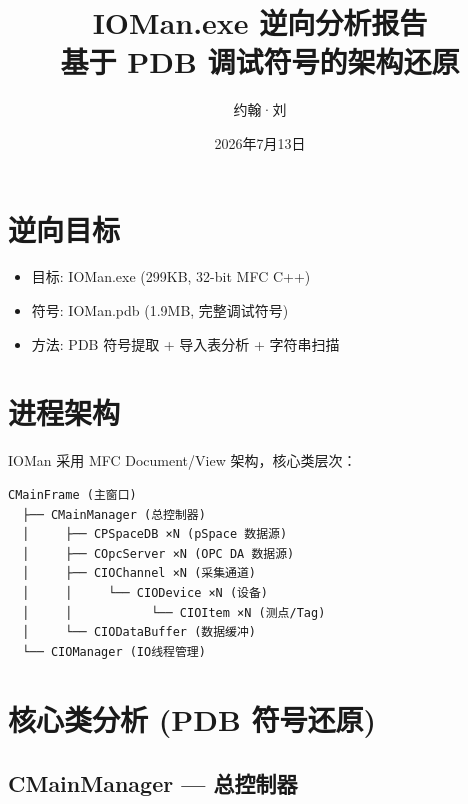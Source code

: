\documentclass[12pt,a4paper]{ctexart}
\title{\textbf{IOMan.exe 逆向分析报告}\\基于 PDB 调试符号的架构还原}
\author{约翰·刘}\date{2026年7月13日}
\begin{document}
\maketitle
\section{逆向目标}
\begin{itemize}[leftmargin=*]
  \item 目标: IOMan.exe (299KB, 32-bit MFC C++)
  \item 符号: IOMan.pdb (1.9MB, 完整调试符号)
  \item 方法: PDB 符号提取 + 导入表分析 + 字符串扫描
\end{itemize}

\section{进程架构}

IOMan 采用 MFC Document/View 架构，核心类层次：

\begin{verbatim}
CMainFrame (主窗口)
  ├── CMainManager (总控制器)
  │     ├── CPSpaceDB ×N (pSpace 数据源)
  │     ├── COpcServer ×N (OPC DA 数据源)
  │     ├── CIOChannel ×N (采集通道)
  │     │     └── CIODevice ×N (设备)
  │     │           └── CIOItem ×N (测点/Tag)
  │     └── CIODataBuffer (数据缓冲)
  └── CIOManager (IO线程管理)
\end{verbatim}

\section{核心类分析 (PDB 符号还原)}

\subsection{CMainManager — 总控制器}
\end{document}
